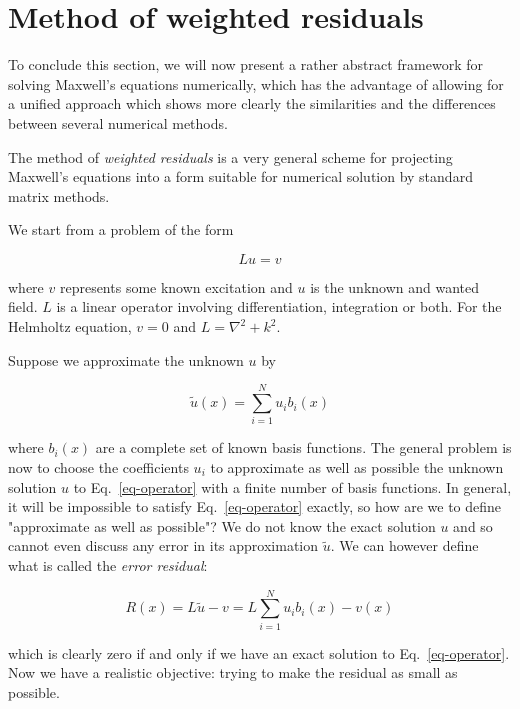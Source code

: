 \section{Method of weighted residuals}

To conclude this section, we will now present a rather abstract framework for solving Maxwell's equations numerically, which has the advantage of allowing for a unified approach which shows more clearly the similarities and the differences between several numerical methods.

The method of \emph{weighted residuals} is a very general scheme for projecting Maxwell's equations into a form suitable for numerical solution by standard matrix methods.

We start from a problem of the form

\begin{equation}
L u = v \label{eq-operator}
\end{equation}

where $v$ represents some known excitation and $u$ is the unknown and wanted field. $L$ is a linear operator involving differentiation, integration or both. For the Helmholtz equation, $v=0$ and $L=\nabla^2 + k^2$. 

Suppose we approximate the unknown $u$ by

\begin{equation}
\tilde{u}(x) = \sum_{i=1}^N u_i b_i(x) \label{eq-expansion}
\end{equation} 

where $b_i(x)$ are a complete set of known basis functions. The general problem is now to choose the coefficients $u_i$ to approximate as well as possible the unknown solution $u$ to Eq.~\ref{eq-operator} with a finite number of basis functions. In general, it will be impossible to satisfy Eq.~\ref{eq-operator} exactly, so how are we to define "approximate as well as possible"? We do not know the exact solution $u$ and so cannot even discuss any error in its approximation $\tilde{u}$. We can however define what is called the \emph{error residual}:

\begin{equation}
R(x) = L\tilde{u} - v = L \sum_{i=1}^N u_i b_i(x) - v(x)
\end{equation} 

which is clearly zero if and only if we have an exact solution to Eq.~\ref{eq-operator}. Now we have a realistic objective: trying to make the residual as small as possible.

